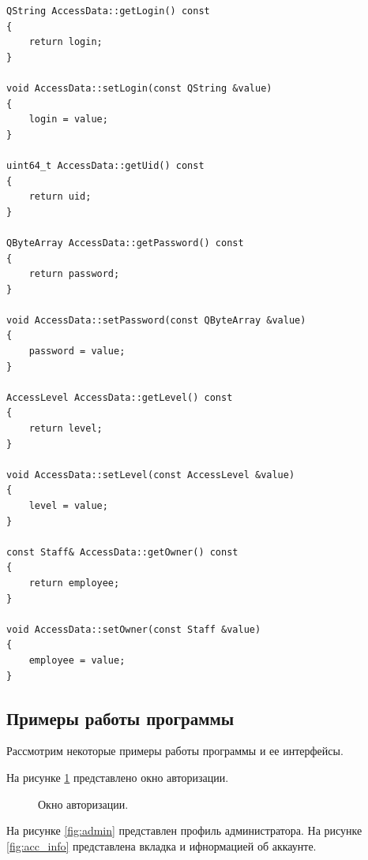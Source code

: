 \documentclass[a4paper,14pt]{article}
\begin{document}
\begin{lstlisting}[label=access_data_cpp,caption=\text{access\_data.cpp.}]
QString AccessData::getLogin() const
{
	return login;
}

void AccessData::setLogin(const QString &value)
{
	login = value;
}

uint64_t AccessData::getUid() const
{
	return uid;
}

QByteArray AccessData::getPassword() const
{
	return password;
}

void AccessData::setPassword(const QByteArray &value)
{
	password = value;
}

AccessLevel AccessData::getLevel() const
{
	return level;
}

void AccessData::setLevel(const AccessLevel &value)
{
	level = value;
}

const Staff& AccessData::getOwner() const
{
	return employee;
}

void AccessData::setOwner(const Staff &value)
{
	employee = value;
}
\end{lstlisting}

\subsection{Примеры работы программы}

Рассмотрим некоторые примеры работы программы и ее интерфейсы.

На рисунке \ref{fig:auth} представлено окно авторизации.

\begin{figure}[!h]
	\caption{Окно авторизации.}
	\label{fig:auth}
\end{figure}

\newpage
На рисунке \ref{fig:admin} представлен профиль администратора. На рисунке \ref{fig:acc_info} представлена вкладка и ифнормацией об аккаунте.
\end{document}
